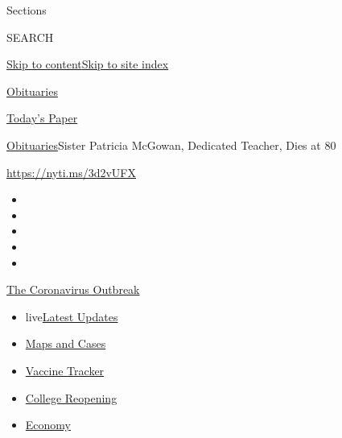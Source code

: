 Sections

SEARCH

\protect\hyperlink{site-content}{Skip to
content}\protect\hyperlink{site-index}{Skip to site index}

\href{https://www.nytimes.com/section/obituaries}{Obituaries}

\href{https://myaccount.nytimes.com/auth/login?response_type=cookie\&client_id=vi}{}

\href{https://www.nytimes.com/section/todayspaper}{Today's Paper}

\href{/section/obituaries}{Obituaries}\textbar{}Sister Patricia McGowan,
Dedicated Teacher, Dies at 80

\url{https://nyti.ms/3d2vUFX}

\begin{itemize}
\item
\item
\item
\item
\item
\end{itemize}

\href{https://www.nytimes.com/news-event/coronavirus?action=click\&pgtype=Article\&state=default\&region=TOP_BANNER\&context=storylines_menu}{The
Coronavirus Outbreak}

\begin{itemize}
\tightlist
\item
  live\href{https://www.nytimes.com/2020/08/03/world/coronavirus-covid-19.html?action=click\&pgtype=Article\&state=default\&region=TOP_BANNER\&context=storylines_menu}{Latest
  Updates}
\item
  \href{https://www.nytimes.com/interactive/2020/us/coronavirus-us-cases.html?action=click\&pgtype=Article\&state=default\&region=TOP_BANNER\&context=storylines_menu}{Maps
  and Cases}
\item
  \href{https://www.nytimes.com/interactive/2020/science/coronavirus-vaccine-tracker.html?action=click\&pgtype=Article\&state=default\&region=TOP_BANNER\&context=storylines_menu}{Vaccine
  Tracker}
\item
  \href{https://www.nytimes.com/2020/08/02/us/covid-college-reopening.html?action=click\&pgtype=Article\&state=default\&region=TOP_BANNER\&context=storylines_menu}{College
  Reopening}
\item
  \href{https://www.nytimes.com/live/2020/08/03/business/stock-market-today-coronavirus?action=click\&pgtype=Article\&state=default\&region=TOP_BANNER\&context=storylines_menu}{Economy}
\end{itemize}

